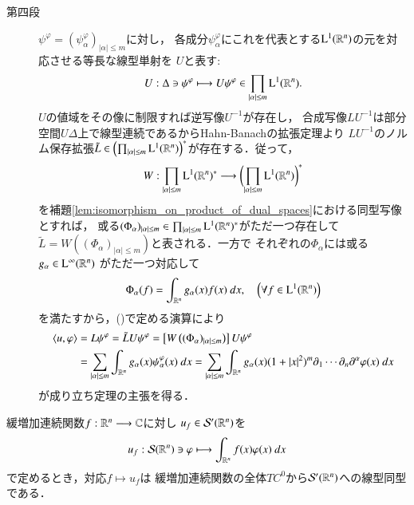 \begin{prf}
\begin{description}
			\item[第四段]
				$\psi^\varphi = (\psi^\varphi_\alpha)_{|\alpha| \leq m}$に対し，
				各成分$\psi^\varphi_\alpha$にこれを代表とする$\mathrm{L}^1(\mathbb{R}^n)$の元を対応させる等長な線型単射を
				$U$と表す:
				\begin{align}
					U:\Delta \ni \psi^\varphi \longmapsto 
					U \psi^\varphi \in \prod_{|\alpha| \leq m} \mathrm{L}^1(\mathbb{R}^n).
				\end{align}
				$U$の値域をその像に制限すれば逆写像$U^{-1}$が存在し，
				合成写像$LU^{-1}$は部分空間$U\Delta$上で線型連続であるからHahn-Banachの拡張定理より
				$LU^{-1}$のノルム保存拡張$\tilde{L} \in \left( \prod_{|\alpha| \leq m} \mathrm{L}^1(\mathbb{R}^n) \right)^*$が存在する．従って，
				\begin{align}
					W:\prod_{|\alpha| \leq m} \mathrm{L}^1(\mathbb{R}^n)^* \longrightarrow 
					\biggl( \prod_{|\alpha| \leq m} \mathrm{L}^1(\mathbb{R}^n) \biggr)^*
				\end{align}
				を補題\ref{lem:isomorphism_on_product_of_dual_spaces}における同型写像とすれば，
				或る$(\Phi_\alpha)_{|\alpha| \leq m} \in \prod_{|\alpha| \leq m} \mathrm{L}^1(\mathbb{R}^n)^*$がただ一つ存在して$\tilde{L} = W \left((\Phi_\alpha)_{|\alpha| \leq m}\right)$と表される．一方で
				それぞれの$\Phi_\alpha$には或る$g_\alpha \in \mathrm{L}^\infty(\mathbb{R}^n)$
				がただ一つ対応して
				\begin{align}
					\Phi_\alpha (f) = \int_{\mathbb{R}^n} g_\alpha(x)f(x)\ dx,
					\quad \left( \forall f \in \mathrm{L}^1(\mathbb{R}^n) \right)
				\end{align}
				を満たすから，()で定める演算により
				\begin{align}
					\inprod<u,\varphi>
					&= L\psi^\varphi
					= \tilde{L}U\psi^\varphi
					= \left[ W \left((\Phi_\alpha)_{|\alpha| \leq m}\right) \right] U\psi^\varphi \\
					&= \sum_{|\alpha| \leq m} \int_{\R^n} g_\alpha(x) \psi^\varphi_\alpha(x)\ dx
					= \sum_{|\alpha| \leq m} \int_{\R^n} g_\alpha(x) (1+|x|^2)^m \partial_1 \cdots \partial_n\partial^\alpha \varphi(x)\ dx
				\end{align}
				が成り立ち定理の主張を得る．
				\QED
		\end{description}
	\end{prf}
	
	\begin{screen}
		\begin{thm}[緩増加連続関数と緩増加超関数の一対一対応]
			緩増加連続関数$f:\mathbb{R}^n \longrightarrow \mathbb{C}$に対し
			$u_f \in \mathcal{S}'(\mathbb{R}^n)$を
			\begin{align}
				u_f: \mathcal{S}(\mathbb{R}^n) \ni \varphi \longmapsto
				\int_{\mathbb{R}^n} f(x) \varphi(x)\ dx
			\end{align}
			で定めるとき，対応$f \longmapsto u_f$は
			緩増加連続関数の全体$TC^0$から$\mathcal{S}'(\mathbb{R}^n)$への線型同型である．
		\end{thm}
	\end{screen}
	
